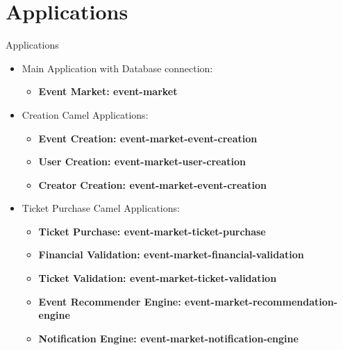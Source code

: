 \documentclass{beamer}
\begin{document}
\section{Applications}
\begin{frame}{Applications}
    \begin{itemize}
        \item Main Application with Database connection:
        \begin{itemize}
            \item \textbf{Event Market: event-market}
        \end{itemize}
        \item Creation Camel Applications:
        \begin{itemize}
            \item \textbf{Event Creation: event-market-event-creation}
            \item \textbf{User Creation: event-market-user-creation}
            \item \textbf{Creator Creation: event-market-event-creation}
        \end{itemize}
        \item Ticket Purchase Camel Applications:
        \begin{itemize}
            \item \textbf{Ticket Purchase: event-market-ticket-purchase}
            \item \textbf{Financial Validation: event-market-financial-validation}
            \item \textbf{Ticket Validation: event-market-ticket-validation}
            \item \textbf{Event Recommender Engine: event-market-recommendation-engine}
            \item \textbf{Notification Engine: event-market-notification-engine}
        \end{itemize}
    \end{itemize}
\end{frame}
\end{document}
